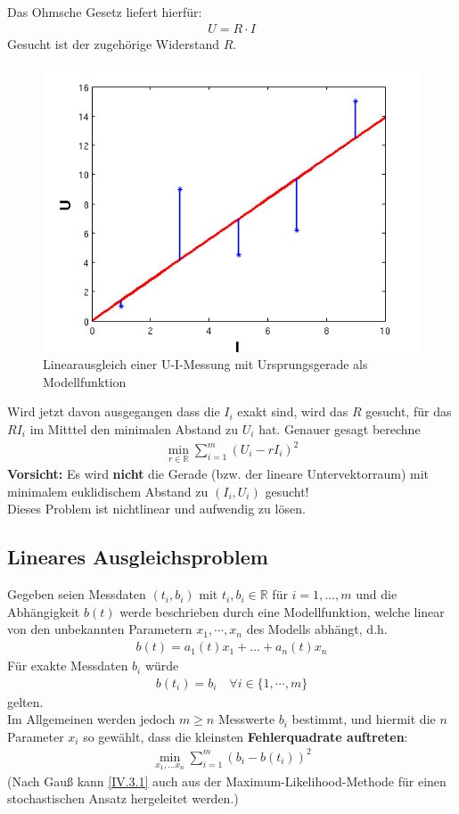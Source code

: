 \documentclass[ngerman,fontsize=11pt, paper=a4, parskip=half, titlepage=true, toc=bib]{scrbook}
\newcommand{\R}{\mathds{R}}
\begin{document}
  
  Das Ohmsche Gesetz liefert hierfür:
  \begin{gather*}
    U=R\cdot I
  \end{gather*}
  Gesucht ist der zugehörige Widerstand $R$.\\
  
  \begin{figure}
    \parbox{\linewidth}{
      \centering
      \includegraphics[width=0.5\linewidth]{images/linausgl2.png}
    }
    \caption{Linearausgleich einer U-I-Messung mit Ursprungsgerade als Modellfunktion}
  \end{figure}
  
  
  Wird jetzt davon ausgegangen dass die $I_i$ exakt sind, wird das $R$ gesucht, 
  für das $RI_i$ im Mitttel den minimalen Abstand zu $U_i$ hat.
  Genauer gesagt berechne
  \begin{gather*}
    \min_{r\in\R} \sum_{i=1}^{m}(U_i-rI_i)^2
  \end{gather*}
  \textbf{Vorsicht: } Es wird \textbf{nicht} die Gerade (bzw. der lineare Untervektorraum) mit 
  minimalem euklidischem Abstand zu $(I_i,U_i)$ gesucht! \\
  Dieses Problem ist nichtlinear und aufwendig zu lösen.\\
  

  
  \subsection{Lineares Ausgleichsproblem} 
  Gegeben seien Messdaten $(t_i, b_i)$ mit $t_i, b_i\in \R$ für $i=1, \dots, m$ 
  und die Abhängigkeit $b(t)$ werde beschrieben durch eine Modellfunktion,
  welche linear von den unbekannten Parametern $x_1, \cdots, x_n$ des Modells abhängt,
  d.h.
  \begin{gather*}
    b(t) = a_1(t)x_1 + \dots + a_n(t) x_n
  \end{gather*}
  Für exakte Messdaten $b_i$ würde 
  \begin{gather*}
    b(t_i) = b_i \quad \forall i\in\{1,\cdots , m\}
  \end{gather*}
  gelten.\\
  Im Allgemeinen werden jedoch $m\geq n $ Messwerte $b_i$ bestimmt,
  und hiermit die $n$ Parameter $x_i$ so gewählt, dass die kleinsten
  \textbf{Fehlerquadrate auftreten}:
  \begin{gather}
    \min_{x_1, \dots x_n} \sum_{i=1}^{m} (b_i-b(t_i))^2 \label{IV.3.1}
  \end{gather}
  (Nach Gauß kann \eqref{IV.3.1} auch aus der Maximum-Likelihood-Methode
  für einen stochastischen Ansatz hergeleitet werden.)\\
  
\end{document}

